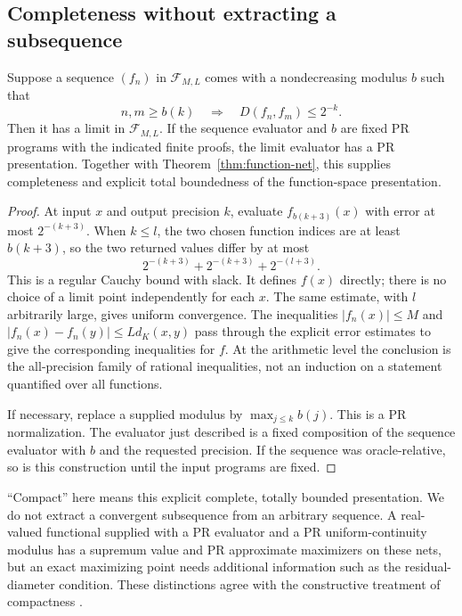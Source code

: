 \subsection{Completeness without extracting a subsequence}

\begin{proposition}\label{prop:function-complete}
Suppose a sequence \((f_n)\) in \(\mathcal F_{M,L}\) comes with a nondecreasing modulus \(b\) such that
\[
 n,m\geq b(k)\quad\Longrightarrow\quad D(f_n,f_m)\leq2^{-k}.
\]
Then it has a limit in \(\mathcal F_{M,L}\). If the sequence evaluator and \(b\) are fixed PR programs with the indicated finite proofs, the limit evaluator has a PR presentation. Together with Theorem~\ref{thm:function-net}, this supplies completeness and explicit total boundedness of the function-space presentation.
\end{proposition}

\begin{proof}
At input \(x\) and output precision \(k\), evaluate \(f_{b(k+3)}(x)\) with error at most \(2^{-(k+3)}\). When \(k\leq l\), the two chosen function indices are at least \(b(k+3)\), so the two returned values differ by at most
\[
 2^{-(k+3)}+2^{-(k+3)}+2^{-(l+3)}.
\]
This is a regular Cauchy bound with slack. It defines \(f(x)\) directly; there is no choice of a limit point independently for each \(x\). The same estimate, with \(l\) arbitrarily large, gives uniform convergence. The inequalities \(|f_n(x)|\leq M\) and \(|f_n(x)-f_n(y)|\leq Ld_K(x,y)\) pass through the explicit error estimates to give the corresponding inequalities for \(f\). At the arithmetic level the conclusion is the all-precision family of rational inequalities, not an induction on a statement quantified over all functions.

If necessary, replace a supplied modulus by \(\max_{j\leq k}b(j)\). This is a PR normalization. The evaluator just described is a fixed composition of the sequence evaluator with \(b\) and the requested precision. If the sequence was oracle-relative, so is this construction until the input programs are fixed.
\end{proof}

``Compact'' here means this explicit complete, totally bounded presentation. We do not extract a convergent subsequence from an arbitrary sequence. A real-valued functional supplied with a PR evaluator and a PR uniform-continuity modulus has a supremum value and PR approximate maximizers on these nets, but an exact maximizing point needs additional information such as the residual-diameter condition. These distinctions agree with the constructive treatment of compactness \cite{bishop}.

